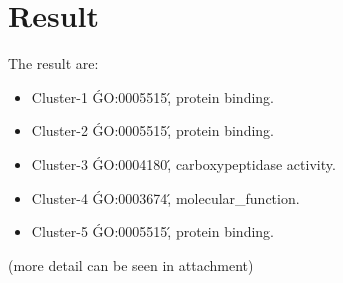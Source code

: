 \section{Result}

The result are:
\begin{itemize}
	\item Cluster-1 \'GO:0005515\', protein binding.
	\item Cluster-2 \'GO:0005515\', protein binding.
	\item Cluster-3 \'GO:0004180\', carboxypeptidase activity.
	\item Cluster-4 \'GO:0003674\', molecular\_function.
	\item Cluster-5 \'GO:0005515\', protein binding.
\end{itemize}

(more detail can be seen in attachment)

